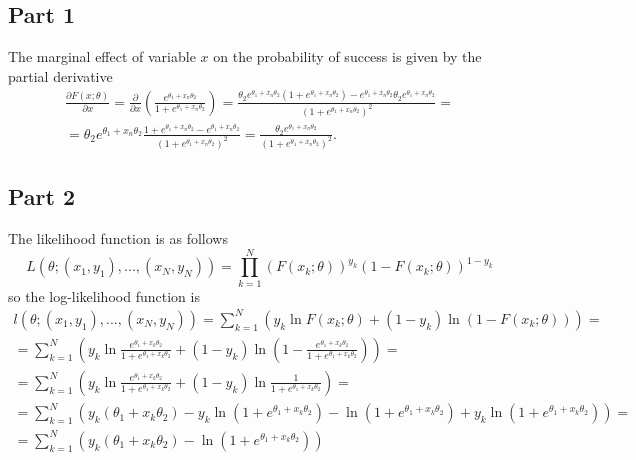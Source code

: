 \documentclass[12pt, a4paper]{article}\usepackage[]{graphicx}\usepackage[]{color}
\begin{document}
\subsection{Part 1}
The marginal effect of variable $x$ on the probability of success is given by the partial derivative
\begin{gather*} 
  \frac{\partial F(x; \theta)}{\partial x} =   
  \frac{\partial}{\partial x} \left(  \frac{e^{\theta_1 + x_n \theta_2}}{1+e^{\theta_1 + x_n \theta_2}}  \right) = 
  \frac{\theta_2 e^{\theta_1 + x_n \theta_2} (1+e^{\theta_1 + x_n \theta_2}) -  e^{\theta_1 + x_n \theta_2} \theta_2 e^{\theta_1 + x_n \theta_2} }
    {\left( 1+e^{\theta_1 + x_n \theta_2} \right)^2 } = \\ =
  \theta_2 e^{\theta_1 + x_n \theta_2} \frac{1+ e^{\theta_1 + x_n \theta_2} -e^{\theta_1 + x_n \theta_2} }
    {\left( 1+e^{\theta_1 + x_n \theta_2} \right)^2 } =
  \frac{\theta_2 e^{\theta_1 + x_n \theta_2}}{\left( 1+e^{\theta_1 + x_n \theta_2} \right)^2 }.
\end{gather*}


\subsection{Part 2}
The likelihood function is as follows
\[L(\theta;(x_{1},y_{1}),...,(x_{N},y_{N}))=\prod_{k=1}^{N}(F(x_{k};\theta))^{y_{k}}(1-F(x_{k};\theta))^{1-y_{k}}\]
so the log-likelihood function is 
\begin{gather*}
  l(\theta;(x_{1},y_{1}),...,(x_{N},y_{N}))=\sum_{k=1}^{N}\left(y_{k}\ln{F(x_{k};\theta)}+(1-y_{k})\ln{(1-F(x_{k};\theta))}\right)=\\
    =\sum_{k=1}^{N}\left(y_{k}
      \ln{\frac{e^{\theta_{1}+x_{k}\theta_{2}}}{1+e^{\theta_{1}+x_{k}\theta_{2}}}}
      +(1-y_{k})\ln{\left(1-\frac{e^{\theta_{1}+x_{k}\theta_{2}}}{1+e^{\theta_{1}+x_{k}\theta_{2}}} \right) }\right)=\\
    =\sum_{k=1}^{N}\left(y_{k}
      \ln{\frac{e^{\theta_{1}+x_{k}\theta_{2}}}{1+e^{\theta_{1}+x_{k}\theta_{2}}}}
      +(1-y_{k})\ln{\frac{1}{1+e^{\theta_{1}+x_{k}\theta_{2}}} }\right)=\\
    =\sum_{k=1}^{N}\left(y_{k}(\theta_{1}+x_{k}\theta_{2})-y_{k}\ln{\left(1+e^{\theta_{1}+x_{k}\theta_{2}}\right)}
      -\ln{\left(1+e^{\theta_{1}+x_{k}\theta_{2}}\right)}
      +y_{k}\ln{\left(1+e^{\theta_{1}+x_{k}\theta_{2}}\right)}\right) = \\
    =\sum_{k=1}^{N}(y_{k}(\theta_{1}+x_{k}\theta_{2})-\ln{(1+e^{\theta_{1}+x_{k}\theta_{2}})})
\end{gather*}
\end{document}
